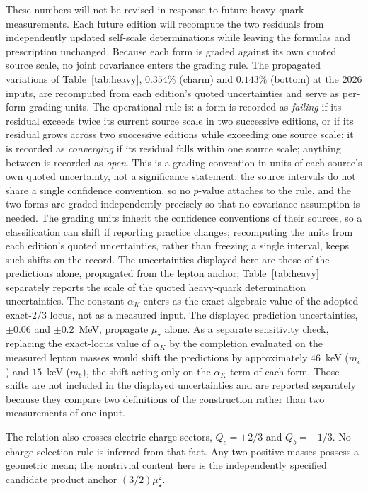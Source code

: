 \documentclass[aps,twocolumn,superscriptaddress,nofootinbib,floatfix]{revtex4-2}
\newcommand{\mstar}{\mu_\star}
\newcommand{\alphaK}{\alpha_K}
\begin{document}
These numbers will not be revised in response to future heavy-quark measurements. Each future edition will recompute the two residuals from independently updated self-scale determinations while leaving the formulas and prescription unchanged. Because each form is graded against its own quoted source scale, no joint covariance enters the grading rule. The propagated variations of Table~\ref{tab:heavy}, $0.354\%$ (charm) and $0.143\%$ (bottom) at the 2026 inputs, are recomputed from each edition's quoted uncertainties and serve as per-form grading units. The operational rule is: a form is recorded as \emph{failing} if its residual exceeds twice its current source scale in two successive editions, or if its residual grows across two successive editions while exceeding one source scale; it is recorded as \emph{converging} if its residual falls within one source scale; anything between is recorded as \emph{open}. This is a grading convention in units of each source's own quoted uncertainty, not a significance statement: the source intervals do not share a single confidence convention, so no $p$-value attaches to the rule, and the two forms are graded independently precisely so that no covariance assumption is needed. The grading units inherit the confidence conventions of their sources, so a classification can shift if reporting practice changes; recomputing the units from each edition's quoted uncertainties, rather than freezing a single interval, keeps such shifts on the record. The uncertainties displayed here are those of the predictions alone, propagated from the lepton anchor; Table~\ref{tab:heavy} separately reports the scale of the quoted heavy-quark determination uncertainties. The constant $\alphaK$ enters as the exact algebraic value of the adopted exact-$2/3$ locus, not as a measured input. The displayed prediction uncertainties, $\pm0.06$ and $\pm0.2$~MeV, propagate $\mstar$ alone. As a separate sensitivity check, replacing the exact-locus value of $\alphaK$ by the completion evaluated on the measured lepton masses would shift the predictions by approximately $46$~keV ($m_c$) and $15$~keV ($m_b$), the shift acting only on the $\alphaK$ term of each form. Those shifts are not included in the displayed uncertainties and are reported separately because they compare two definitions of the construction rather than two measurements of one input.

The relation also crosses electric-charge sectors, $Q_c=+2/3$ and $Q_b=-1/3$. No charge-selection rule is inferred from that fact. Any two positive masses possess a geometric mean; the nontrivial content here is the independently specified candidate product anchor $(3/2)\mstar^2$.
\end{document}
